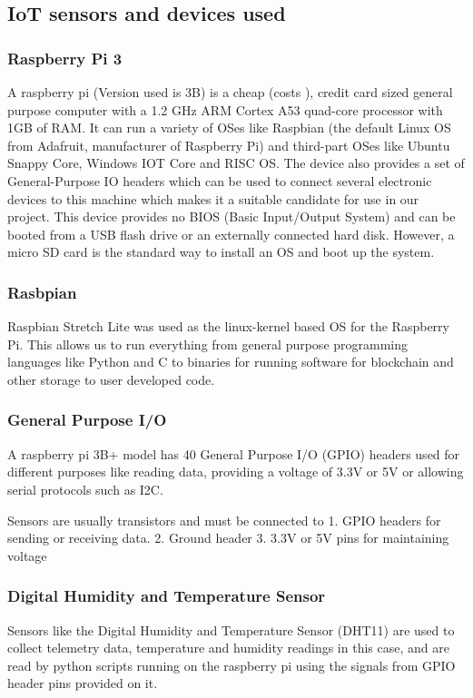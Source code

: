 \documentclass[11pt,openright]{report}
\begin{document}
\subsection{IoT sensors and devices used}
\subsubsection{Raspberry Pi 3}
A raspberry pi (Version used is 3B) is a cheap (costs ), credit card sized general purpose computer with a 1.2 GHz ARM Cortex A53 quad-core processor with 1GB of RAM. It can run a variety of OSes like Raspbian (the default Linux OS from Adafruit, manufacturer of Raspberry Pi) and third-part OSes like Ubuntu Snappy Core, Windows IOT Core and RISC OS. The device also provides a set of General-Purpose IO headers which can be used to connect several electronic devices to this machine which makes it a suitable candidate for use in our project. This device provides no BIOS (Basic Input/Output System) and can be booted from a USB flash drive or an externally connected hard disk. However, a micro SD card is the standard way to install an OS and boot up the system.  

\subsubsection{Rasbpian}
Raspbian Stretch Lite was used as the linux-kernel based OS for the Raspberry Pi. This allows us to run everything from general purpose programming languages like Python and C to binaries for running software for blockchain and other storage to user developed code.

\subsubsection{General Purpose I/O}
A raspberry pi 3B+ model has 40 General Purpose I/O (GPIO) headers used for different purposes like reading data, providing a voltage of 3.3V or 5V or allowing serial protocols such as I2C.

Sensors are usually transistors and must be connected to 
1. GPIO headers for sending or receiving data.
2. Ground header 
3. 3.3V or 5V pins for maintaining voltage

\subsubsection{Digital Humidity and Temperature Sensor}
Sensors like the Digital Humidity and Temperature Sensor (DHT11) are used to collect telemetry data, temperature and humidity readings in this case, and are read by python scripts running on the raspberry pi using the signals from GPIO header pins provided on it.
\end{document}
